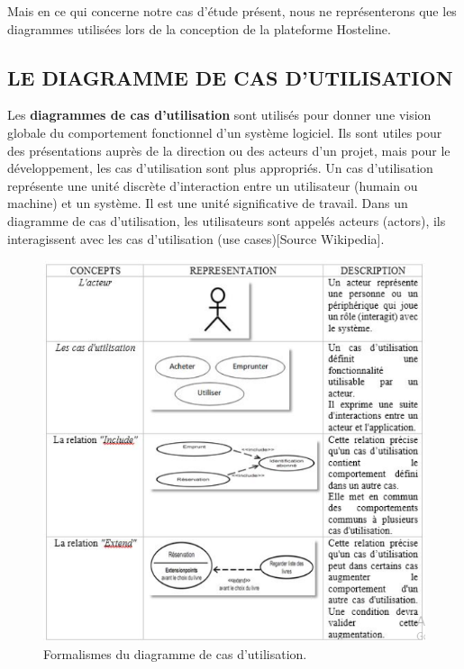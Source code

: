 Mais en ce qui concerne notre cas d’étude présent, nous ne représenterons que les diagrammes utilisées lors de la conception de la plateforme Hosteline.

\subsection{LE DIAGRAMME DE CAS D’UTILISATION}

Les \textbf{diagrammes de cas d'utilisation} sont utilisés pour donner une vision globale du comportement fonctionnel d'un système logiciel. Ils sont utiles pour des présentations auprès de la direction ou des acteurs d'un projet, mais pour le développement, les cas d'utilisation sont plus appropriés. Un cas d'utilisation représente une unité discrète d'interaction entre un utilisateur (humain ou machine) et un système. Il est une unité significative de travail. Dans un diagramme de cas d'utilisation, les utilisateurs sont appelés acteurs (actors), ils interagissent avec les cas d'utilisation (use cases)[Source Wikipedia].

\begin{figure}[!htbp]
	\begin{center}
		\includegraphics[scale=0.95]{images/form_use_case.png}
		\caption{Formalismes du diagramme de cas d'utilisation.}
		\label{use_case_summary}
	\end{center}
\end{figure}

